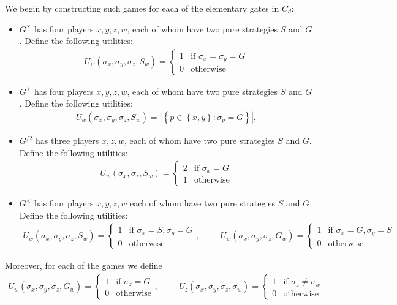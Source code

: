 \documentclass{article}
\begin{document}
We begin by constructing such games for each of the elementary gates
in $C_d$:
\begin{itemize}
  \item $G^\times$ has four players $x,y,z,w$, each of whom have two pure strategies
    $S$ and $G$.
    Define the following utilities:
    \begin{align*}
      U_w(\sigma_x,\sigma_y,\sigma_z, S_w) = \begin{cases}
        1 & \text{if } \sigma_x=\sigma_y= G \\
        0 & \text{otherwise}
      \end{cases}
    \end{align*}
  \item $G^+$ has four players $x,y,z,w$, each of whom have two pure strategies
    $S$ and $G$.
    Define the following utilities:
    \begin{align*}
      U_w(\sigma_x,\sigma_y,\sigma_z, S_w) = |\left\lbrace{p\in\left\lbrace{x,y}\right\rbrace : \sigma_p = G}\right\rbrace|,
    \end{align*}
  \item $G^{/2}$ has three players $x,z,w$, each of whom have two pure strategies
    $S$ and $G$.
    Define the following utilities:
    \begin{align*}
      U_w(\sigma_x,\sigma_z, S_w) = \begin{cases}
        2 & \text{if } \sigma_x= G \\
        1 & \text{otherwise}
      \end{cases}
    \end{align*}
  \item $G^<$ has four players $x,y,z,w$ each of whom have two pure strategies $S$ and $G$. Define the following utilities:
    \begin{align*}
      U_w(\sigma_x,\sigma_y,\sigma_z,S_w) = \begin{cases}
        1 & \text{if }\sigma_x = S,\sigma_y = G\\
        0 & \text{otherwise}
      \end{cases}, \hspace{1cm}
      U_w(\sigma_x,\sigma_y,\sigma_z,G_w) = \begin{cases}
        1 & \text{if }\sigma_x = G,\sigma_y = S\\
        0 & \text{otherwise}
      \end{cases}
    \end{align*}
\end{itemize}
Moreover, for each of the games we define
\begin{align*}
  U_w(\sigma_x,\sigma_y,\sigma_z, G_w) = \begin{cases}
    1 & \text{if } \sigma_z= G \\
    0 & \text{otherwise}
  \end{cases}
  , \hspace{1cm}
  U_z(\sigma_x,\sigma_y,\sigma_z,\sigma_w) = \begin{cases}
    1 & \text{if }\sigma_z\neq\sigma_w\\
    0 & \text{otherwise}
  \end{cases}
\end{align*}
\end{document}
